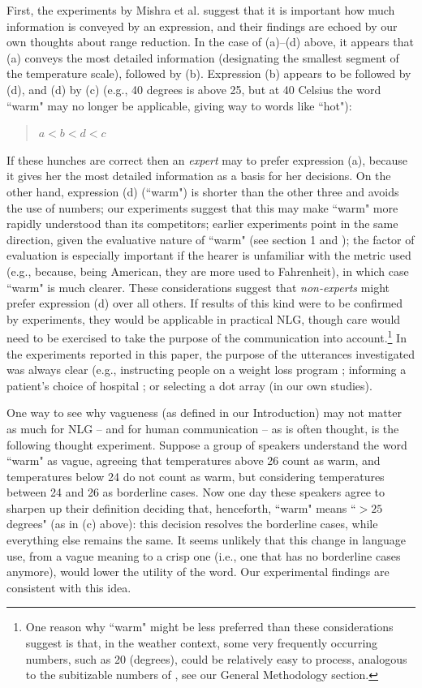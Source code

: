 \documentclass[%
man,		%
floatsintext,%
apacite%
]{apa6}
\begin{document}
First, the experiments by Mishra et al. suggest that it is important how much information is conveyed by an expression, and their findings are echoed by our own thoughts about range reduction. In the case of (a)--(d) above, it appears that (a) conveys the most detailed information (designating the smallest segment of the temperature scale), followed by (b). Expression (b)  appears to be followed by (d), and (d) by (c) (e.g., 40 degrees is above 25, but at 40 Celsius the word ``warm" may no longer be applicable, giving way to words like ``hot"): 
%
\begin{quote}
$a < b < d < c$
\end{quote}
%
If these hunches are correct then an {\em expert} may  to prefer expression (a), because it gives her the most detailed information as a basis for her decisions. On the other hand, expression (d) (``warm") is shorter than the other three and avoids the use of numbers; our experiments suggest that this may make ``warm" more rapidly understood than its competitors; earlier experiments point in the same direction, given the evaluative nature of ``warm" (see section 1 and  \cite{peters2009bringing}); the factor of evaluation is especially important if the hearer is unfamiliar with the metric used (e.g., because, being American, they are more used to Fahrenheit), in which case ``warm" is much clearer. These considerations suggest that {\em non-experts} might prefer expression (d) over all others. If results of this kind were to be confirmed by experiments, they would be applicable in practical NLG, though care would need to be exercised to take the purpose of the communication into account.\footnote{One reason why ``warm" might be less preferred than these considerations suggest is that, in the weather context, some very frequently occurring numbers, such as 20 (degrees), could be relatively easy to process, analogous to the subitizable numbers of \protect\cite{trick1994small}, see our General Methodology section.} In the experiments reported in this paper, the purpose of the utterances investigated was always clear (e.g., instructing people on a weight loss program \cite{Mishra01042011}; informing a patient's choice of hospital \cite{peters2009bringing}; or selecting a dot array (in our own studies). 

One way to see why vagueness (as defined in our Introduction) may not matter as much for NLG -- and for human communication -- as is often thought, is the following thought experiment. Suppose a group of speakers understand the word ``warm" as vague, agreeing that temperatures above 26 count as warm, and temperatures below 24 do not count as warm, but considering temperatures between 24 and 26 as borderline cases. Now one day these speakers agree to sharpen up their definition deciding that, henceforth, ``warm" means ``$>25$ degrees" (as in (c) above): this decision resolves the borderline cases, while everything else remains the same. It seems unlikely that this change in language use, from a vague meaning to a crisp one (i.e., one that has no borderline cases anymore), would lower the utility of the word. Our experimental findings are consistent with this idea.

\setcounter{secnumdepth}{0}

\end{document}
